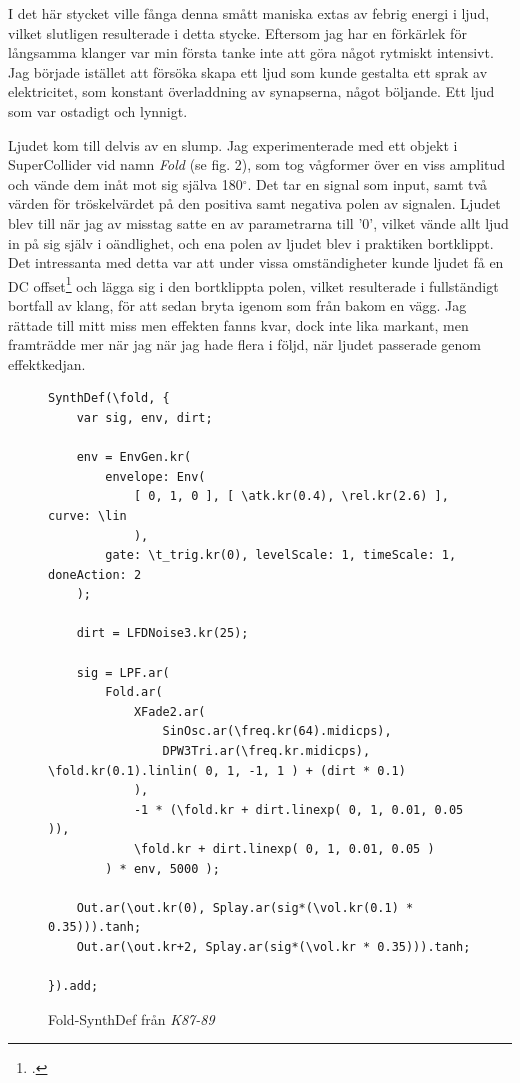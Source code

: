 \documentclass{article}
\renewcommand{\baselinestretch}{1.5}
\begin{document}
I det här stycket ville fånga denna smått maniska extas av febrig energi i ljud, vilket slutligen resulterade
i detta stycke. Eftersom jag har en förkärlek för långsamma klanger var min första tanke inte att göra något
rytmiskt intensivt. Jag började istället att försöka skapa ett ljud som kunde gestalta ett sprak av
elektricitet, som konstant överladdning av synapserna, något böljande. Ett ljud som var ostadigt och lynnigt.

Ljudet kom till delvis av en slump. Jag experimenterade med ett objekt i SuperCollider vid namn \emph{Fold}
(se fig. 2), som
tog vågformer över en viss amplitud och vände dem inåt mot sig själva 180$^{\circ}$. Det tar en signal som
input, samt två värden för tröskelvärdet på den positiva samt negativa polen av signalen. Ljudet blev till när
jag av misstag satte en av parametrarna till '0', vilket vände allt ljud in på sig själv i oändlighet, och ena
polen av ljudet blev i praktiken bortklippt. Det intressanta med detta var att under vissa omständigheter
kunde ljudet få en DC offset\footcite{dc} och lägga sig i den
bortklippta polen, vilket resulterade i fullständigt bortfall av klang, för att sedan bryta igenom som från
bakom en vägg. Jag rättade till mitt miss men effekten fanns kvar, dock inte lika markant, men framträdde mer
när jag när jag hade flera i följd, när ljudet passerade genom effektkedjan.

\pagebreak
\begin{figure}
\renewcommand{\baselinestretch}{1}
\begin{lstlisting}[style=SuperCollider-IDE]
SynthDef(\fold, {
	var sig, env, dirt;

	env = EnvGen.kr(
		envelope: Env(
			[ 0, 1, 0 ], [ \atk.kr(0.4), \rel.kr(2.6) ], curve: \lin
			), 
		gate: \t_trig.kr(0), levelScale: 1, timeScale: 1, doneAction: 2
	);

	dirt = LFDNoise3.kr(25);

	sig = LPF.ar( 
		Fold.ar(
			XFade2.ar(
				SinOsc.ar(\freq.kr(64).midicps), 
				DPW3Tri.ar(\freq.kr.midicps), \fold.kr(0.1).linlin( 0, 1, -1, 1 ) + (dirt * 0.1)
			),
			-1 * (\fold.kr + dirt.linexp( 0, 1, 0.01, 0.05 )),
			\fold.kr + dirt.linexp( 0, 1, 0.01, 0.05 )
		) * env, 5000 );

	Out.ar(\out.kr(0), Splay.ar(sig*(\vol.kr(0.1) * 0.35))).tanh;
	Out.ar(\out.kr+2, Splay.ar(sig*(\vol.kr * 0.35))).tanh;

}).add;
\end{lstlisting}
\caption{Fold-SynthDef från \emph{K87-89}}
\end{figure}
\renewcommand{\baselinestretch}{1.5}
\end{document}
